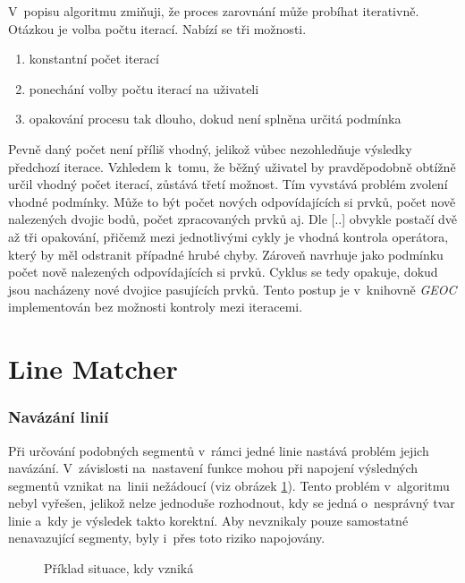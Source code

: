 V~popisu algoritmu zmiňuji, že proces zarovnání může probíhat iterativně.
Otázkou je volba počtu iterací. Nabízí se tři možnosti.
\begin{enumerate}
 \item konstantní počet iterací
 \item ponechání volby počtu iterací na uživateli
 \item opakování procesu tak dlouho, dokud není splněna určitá podmínka
\end{enumerate}
Pevně daný počet není příliš vhodný, jelikož vůbec nezohledňuje výsledky
předchozí iterace. Vzhledem k~tomu, že běžný uživatel by pravděpodobně
obtížně určil vhodný počet iterací, zůstává třetí možnost. Tím vyvstává
problém zvolení vhodné podmínky. Může to být počet nových odpovídajících 
si prvků, počet nově nalezených dvojic bodů, počet zpracovaných prvků aj.
Dle [..]  obvykle postačí dvě až tři opakování, %
přičemž mezi jednotlivými cykly je vhodná kontrola operátora,
který by měl odstranit případné hrubé chyby. Zároveň navrhuje jako podmínku
počet nově nalezených odpovídajících si prvků. Cyklus se tedy opakuje,
dokud jsou nacházeny nové dvojice pasujících prvků. Tento postup je   %
v~knihovně \textit{GEOC} implementován bez možnosti kontroly mezi iteracemi. 


\section{Line Matcher}
\label{problemy-lm}

\subsubsection*{Navázání linií}
Při určování podobných segmentů v~rámci jedné linie nastává problém jejich
navázání. V~závislosti na~nastavení funkce mohou při napojení výsledných
segmentů vznikat na~linii nežádoucí  (viz obrázek \ref{fig:toothpic}). %
Tento problém v~algoritmu nebyl vyřešen, jelikož nelze jednoduše rozhodnout, 
kdy se jedná o~nesprávný tvar linie a~kdy je výsledek takto korektní.
Aby nevznikaly pouze samostatné nenavazující segmenty, byly i~přes toto
riziko napojovány.

\label{toothpic}
  \begin{figure}[hbt]
    \centering
      
      \caption{Příklad situace, kdy vzniká }
      \label{fig:toothpic}
  \end{figure}

